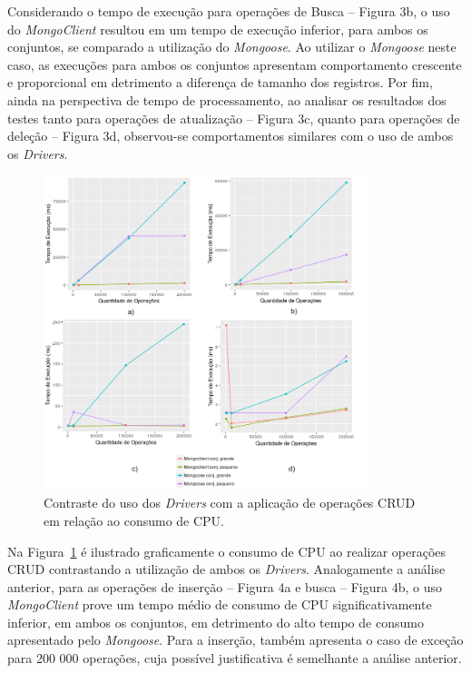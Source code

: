 \documentclass{svproc}
\begin{document}
Considerando o tempo de execução para operações de Busca -- Figura 3b, o uso do \emph{MongoClient} resultou em um tempo de execução inferior, para ambos os conjuntos, se comparado a utilização do \emph{Mongoose}. Ao utilizar o \emph{Mongoose} neste caso, as execuções para ambos os conjuntos apresentam comportamento crescente e proporcional em detrimento a diferença de tamanho dos registros. Por fim, ainda na perspectiva de tempo de processamento, ao analisar os resultados dos testes tanto para operações de atualização -- Figura 3c, quanto para operações de deleção -- Figura 3d, observou-se comportamentos similares com o uso de ambos os \emph{Drivers}.

\begin{figure}[ht]
    \centering
    \includegraphics[width=0.85\textwidth]{images/cpuusage}
	 \caption{Contraste do uso dos \emph{Drivers} com a aplicação de operações CRUD em relação ao consumo de CPU.}
    \label{fig:cpuusage}
\end{figure}

Na Figura~\ref{fig:cpuusage} é ilustrado graficamente o consumo de CPU ao realizar operações CRUD contrastando a utilização de ambos os \emph{Drivers}.
Analogamente a análise anterior, para as operações de inserção -- Figura 4a e busca -- Figura 4b, o uso \emph{MongoClient} prove um tempo médio de consumo de CPU significativamente inferior, em ambos os conjuntos, em detrimento do alto tempo de consumo apresentado pelo \emph{Mongoose}. Para a inserção, também apresenta o caso de exceção para 200 000 operações, cuja possível justificativa é semelhante a análise anterior.
\end{document}
